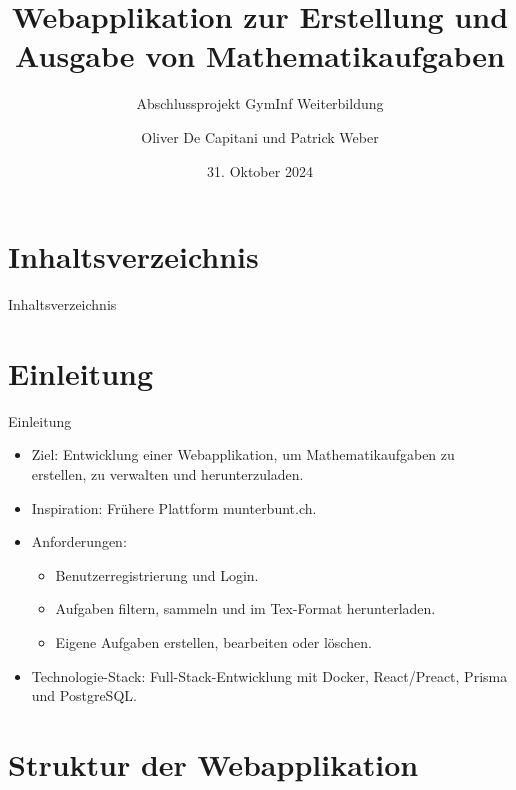 \documentclass{beamer}
\title{Webapplikation zur Erstellung und Ausgabe von Mathematikaufgaben}
\subtitle{Abschlussprojekt GymInf Weiterbildung}
\author{Oliver De Capitani und Patrick Weber}
\date{31. Oktober 2024}
\begin{document}
\frame{\titlepage}

\section*{Inhaltsverzeichnis}
\begin{frame}{Inhaltsverzeichnis}
    \tableofcontents
\end{frame}

\section{Einleitung}
\begin{frame}{Einleitung}
    \begin{itemize}
        \item Ziel: Entwicklung einer Webapplikation, um Mathematikaufgaben zu erstellen, zu verwalten und herunterzuladen.
        \item Inspiration: Frühere Plattform munterbunt.ch.
        \item Anforderungen:
        \begin{itemize}
            \item Benutzerregistrierung und Login.
            \item Aufgaben filtern, sammeln und im Tex-Format herunterladen.
            \item Eigene Aufgaben erstellen, bearbeiten oder löschen.
        \end{itemize}
        \item Technologie-Stack: Full-Stack-Entwicklung mit Docker, React/Preact, Prisma und PostgreSQL.
    \end{itemize}
\end{frame}

\section{Struktur der Webapplikation}
\end{document}
